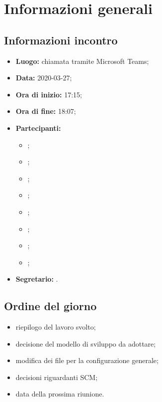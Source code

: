 \section{Informazioni generali}
\subsection{Informazioni incontro}
\begin{itemize}
	\item \textbf{Luogo:} chiamata tramite Microsoft Teams; 
	\item \textbf{Data:} 2020-03-27;
	\item \textbf{Ora di inizio:} 17:15; 
	\item \textbf{Ora di fine:} 18:07; 
	\item \textbf{Partecipanti:}
		\begin{itemize}
			\item \VB; 
			\item \LB; 
			\item \NF; 
			\item \EG; 
			\item \FJ; 
			\item \MP; 
			\item \AS; 
			\item \AZ; 
		\end{itemize}
	\item \textbf{Segretario:} \NF. 
\end{itemize}

\subsection{Ordine del giorno}
\begin{itemize}
	\item riepilogo del lavoro svolto;
	\item decisione del modello di sviluppo da adottare;
	\item modifica dei file per la configurazione generale;
	\item decisioni riguardanti SCM;
	\item data della prossima riunione.
\end{itemize}
